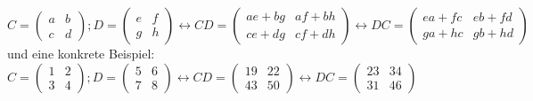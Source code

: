 \documentclass{standalone}
\begin{document}
\begin{itemize}
	$C=\begin{pmatrix}
		a & b \\
		c & d
	\end{pmatrix}; 
	D=\begin{pmatrix}
		e & f \\
		g & h
	\end{pmatrix} \leftrightarrow CD= \begin{pmatrix}
	ae+bg & af+bh \\
	ce+dg & cf+dh
\end{pmatrix}\leftrightarrow DC= \begin{pmatrix}
ea+fc & eb+fd  \\
ga+hc & gb+hd
\end{pmatrix}$ und eine konkrete Beispiel:\\
$C=\begin{pmatrix}
	1 & 2 \\
	3 & 4
\end{pmatrix}; 
D=\begin{pmatrix}
	5 & 6 \\
	7 & 8
\end{pmatrix} \leftrightarrow CD= \begin{pmatrix}
	19 & 22 \\
	43 & 50
\end{pmatrix}\leftrightarrow DC= \begin{pmatrix}
	23 & 34  \\
	31 & 46
\end{pmatrix}$

\end{itemize}
\end{document}
